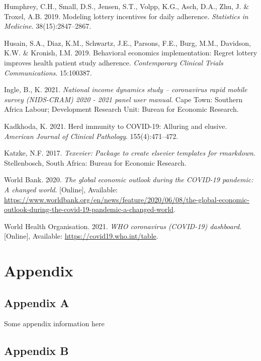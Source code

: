 \documentclass[11pt,preprint, authoryear]{elsarticle}
\numberwithin{equation}{section}
\numberwithin{figure}{section}
\numberwithin{table}{section}
\newlength{\cslhangindent}
\newenvironment{CSLReferences}%
  {\setlength{\parindent}{0pt}%
  \everypar{\setlength{\hangindent}{\cslhangindent}}\ignorespaces}%
  {\par}
\begin{document}
\begin{CSLReferences}{1}{0}
\leavevmode\hypertarget{ref-adhere}{}%
Humphrey, C.H., Small, D.S., Jensen, S.T., Volpp, K.G., Asch, D.A., Zhu,
J. \& Troxel, A.B. 2019. Modeling lottery incentives for daily
adherence. \emph{Statistics in Medicine}. 38(15):2847--2867.

\leavevmode\hypertarget{ref-regr}{}%
Husain, S.A., Diaz, K.M., Schwartz, J.E., Parsons, F.E., Burg, M.M.,
Davidson, K.W. \& Kronish, I.M. 2019. Behavioral economics
implementation: Regret lottery improves health patient study adherence.
\emph{Contemporary Clinical Trials Communications}. 15:100387.

\leavevmode\hypertarget{ref-nids}{}%
Ingle, B., K. 2021. \emph{National income dynamics study -- coronavirus
rapid mobile survey (NIDS-CRAM) 2020 - 2021 panel user manual.} Cape
Town: Southern Africa Labour; Development Research Unit: Bureau for
Economic Research.

\leavevmode\hypertarget{ref-bad}{}%
Kadkhoda, K. 2021. Herd immunity to COVID-19: Alluring and elusive.
\emph{American Journal of Clinical Pathology}. 155(4):471--472.

\leavevmode\hypertarget{ref-Texevier}{}%
Katzke, N.F. 2017. \emph{{Texevier}: {P}ackage to create elsevier
templates for rmarkdown}. Stellenbosch, South Africa: Bureau for
Economic Research.

\leavevmode\hypertarget{ref-bank}{}%
World Bank. 2020. \emph{The global economic outlook during the COVID-19
pandemic: A changed world}. {[}Online{]}, Available:
\url{https://www.worldbank.org/en/news/feature/2020/06/08/the-global-economic-outlook-during-the-covid-19-pandemic-a-changed-world}.

\leavevmode\hypertarget{ref-who}{}%
World Health Organisation. 2021. \emph{WHO coronavirus (COVID-19)
dashboard}. {[}Online{]}, Available:
\url{https://covid19.who.int/table}.

\end{CSLReferences}

\hypertarget{appendix}{%
\section*{Appendix}\label{appendix}}

\hypertarget{appendix-a}{%
\subsection*{Appendix A}\label{appendix-a}}

Some appendix information here

\hypertarget{appendix-b}{%
\subsection*{Appendix B}\label{appendix-b}}


\end{document}
